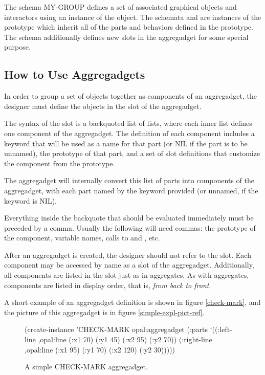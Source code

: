 The schema MY-GROUP defines a set of associated graphical objects and
interactors using an instance of the  object.  The
schemata  and  are instances of the 
prototype which inherit all of the parts and behaviors defined in the
prototype.  The  schema additionally defines new slots in the
aggregadget for some special purpose.


\subsection{How to Use Aggregadgets}
\label{what-an-agg}
\label{parts-syntax-sec}
In order to group a set of objects together as components of an aggregadget,
the designer must define the objects in the  slot of the
aggregadget.

The syntax of the  slot is a backquoted list of lists, where
each inner list defines one component of the aggregadget.
The definition of each component includes a keyword that will be used as a
name for that part
(or NIL if the part is to be unnamed), the prototype of that part, and a
set of slot definitions that customize the component from the prototype.

The aggregadget will internally convert this list of parts into components of
the aggregadget, with each part named by the keyword provided (or unnamed,
if the keyword is NIL).

Everything inside the backquote that should be evaluated immediately must be
preceded by a comma.  Usually the following will need commas:
the prototype of the component, variable names, calls to 
and , etc.

After an aggregadget is created, the designer should not refer to the
 slot.  Each component may be accessed by name as a slot of the
aggregadget.  Additionally, all components are listed in the
 slot just as in aggregates.
  As with aggregates, components are listed
in display order, that is, {\it from back to front}.

A short example of an aggregadget definition
is shown in figure \ref{check-mark}, and the picture of this
aggregadget is in figure \ref{simple-expl-pict-ref}.

\begin{figure}
\begin{programexample}
(create-instance 'CHECK-MARK opal:aggregadget
   (:parts
    `((:left-line ,opal:line
                  (:x1 70)
                  (:y1 45)
                  (:x2 95)
                  (:y2 70))
      (:right-line ,opal:line
                   (:x1 95)
                   (:y1 70)
                   (:x2 120)
                   (:y2 30)))))
\end{programexample}
\caption{A simple CHECK-MARK aggregadget.}
\end{figure}

